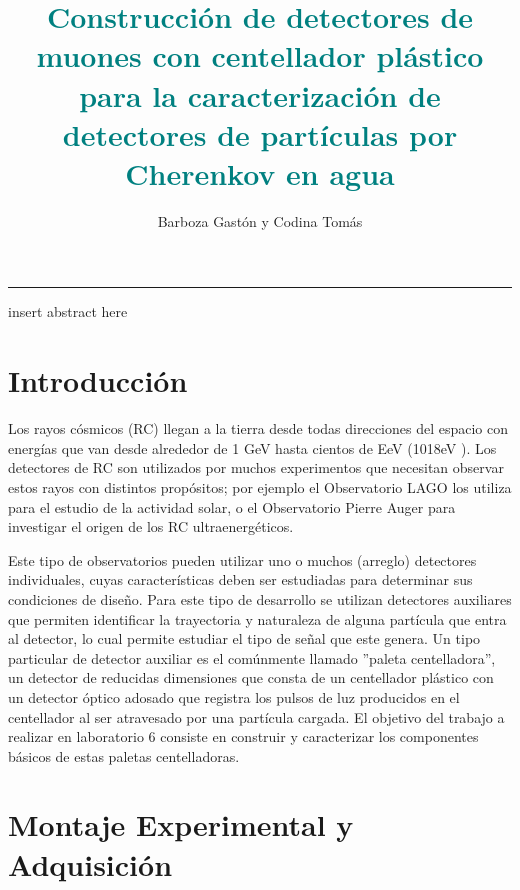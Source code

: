 \documentclass[12pt,a4paper]{article}
\title{\vspace{-20pt}\Large{\textbf{\textcolor{teal}{Construcción de detectores de muones con centellador plástico para la caracterización de detectores de partículas por Cherenkov en agua}}}}
\date{}
\author{Barboza Gastón y Codina Tomás}
\affil{Instituto de Astronomía y Física del Espacio FCEyN, UBA}
\affil{barboza.gaston@gmail.com, tomycodina@gmail.com}
\numberwithin{equation}{section}
\begin{document}
\maketitle
\thispagestyle{lab}

\begin{center}
\vspace{-40pt}\rule{\textwidth}{0.2pt}
\end{center}


\begin{boxumen}
insert abstract here
\end{boxumen}

\section{Introducción}


Los rayos cósmicos (RC) llegan a la tierra desde todas direcciones
del espacio con energías que van desde alrededor de 1 GeV hasta cientos
de EeV (1018eV ). Los detectores de RC son utilizados por muchos
experimentos que necesitan observar estos rayos con distintos propósitos;
por ejemplo el Observatorio LAGO los utiliza para el estudio de la
actividad solar, o el Observatorio Pierre Auger para investigar el origen
de los RC ultraenergéticos.

Este tipo de observatorios pueden utilizar
uno o muchos (arreglo) detectores individuales, cuyas características
deben ser estudiadas para determinar sus condiciones de diseño. Para
este tipo de desarrollo se utilizan detectores auxiliares que permiten
identificar la trayectoria y naturaleza de alguna partícula que entra al
detector, lo cual permite estudiar el tipo de señal que este genera. Un
tipo particular de detector auxiliar es el comúnmente llamado ''paleta
centelladora'', un detector de reducidas dimensiones que consta de
un centellador plástico con un detector óptico adosado que registra los
pulsos de luz producidos en el centellador al ser atravesado por una
partícula cargada. El objetivo del trabajo a realizar en laboratorio 6 consiste en construir y caracterizar los componentes básicos de estas paletas centelladoras.



\section{Montaje Experimental y Adquisición}

\end{document}

